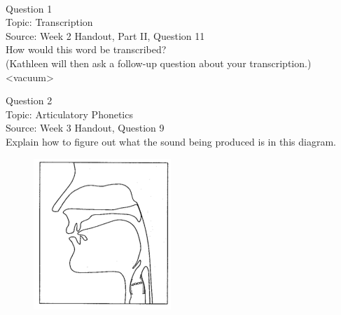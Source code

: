 \documentclass[12pt]{article}
\begin{document}
\newpage

\begin{center}
\textbf{{\color{red}{\HUGE END OF EXAM}}}\\

\end{center}
\newpage

\begin{center}
\textbf{{\color{blue}{\HUGE START OF EXAM\\}}}

\textbf{{\color{blue}{\HUGE Student ID: 33446\\}}}

\textbf{{\color{blue}{\HUGE \\}}}

\end{center}
\newpage

{\large Question 1}\\

Topic: Transcription\\
Source: Week 2 Handout, Part II, Question 11\\

How would this word be transcribed?\\ (Kathleen will then ask a follow-up question about your transcription.)\\

<vacuum>


\newpage

{\large Question 2}\\

Topic: Articulatory Phonetics\\
Source: Week 3 Handout, Question 9\\

Explain how to figure out what the sound being produced is in this diagram.\\

\begin{figure}[H]
\includegraphics{../images/sagittal_eth.png}
\end{figure}
\end{document}
